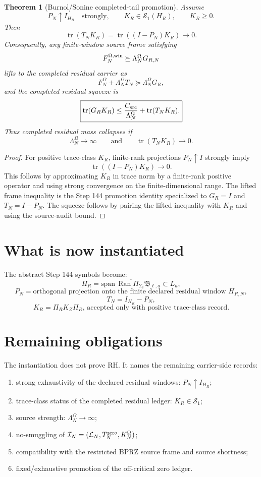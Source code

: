 \documentclass[11pt]{article}
\newtheorem{theorem}{Theorem}
\begin{document}
\begin{theorem}[Burnol/Sonine completed-tail promotion]
Assume
\[
P_N\uparrow I_{H_R}\quad\text{strongly},
\qquad
K_R\in\mathcal S_1(H_R),
\qquad K_R\ge0.
\]
Then
\[
\boxed{
\operatorname{tr}(T_NK_R)=\operatorname{tr}((I-P_N)K_R)\to0.
}
\]
Consequently, any finite-window source frame satisfying
\[
F_N^{\Omega,\rm win}\succeq \Lambda_N^\Omega G_{R,N}
\]
lifts to the completed residual carrier as
\[
F_N^\Omega+\Lambda_N^\Omega T_N\succeq \Lambda_N^\Omega G_R,
\]
and the completed residual squeeze is
\[
\boxed{
\operatorname{tr}(G_RK_R)
\le
\frac{C_{\rm src}}{\Lambda_N^\Omega}
+\operatorname{tr}(T_NK_R).
}
\]
Thus completed residual mass collapses if
\[
\Lambda_N^\Omega\to\infty
\qquad\text{and}\qquad
\operatorname{tr}(T_NK_R)\to0.
\]
\end{theorem}

\begin{proof}
For positive trace-class $K_R$, finite-rank projections $P_N\uparrow I$ strongly imply
\[
\operatorname{tr}((I-P_N)K_R)\to0.
\]
This follows by approximating $K_R$ in trace norm by a finite-rank positive operator and using strong convergence on the finite-dimensional range.  The lifted frame inequality is the Step 144 promotion identity specialized to $G_R=I$ and $T_N=I-P_N$.  The squeeze follows by pairing the lifted inequality with $K_R$ and using the source-audit bound.
\end{proof}

\section{What is now instantiated}
The abstract Step 144 symbols become:
\[
\boxed{H_R=\overline{\mathrm{span}\,\operatorname{Ran}\Pi_{Y_a}\mathfrak B_{\ell,a}}\subset L_a,}
\]
\[
\boxed{P_N=\text{orthogonal projection onto the finite declared residual window }H_{R,N},}
\]
\[
\boxed{T_N=I_{H_R}-P_N,}
\]
\[
\boxed{K_R=\Pi_RK_Z\Pi_R\text{, accepted only with positive trace-class record.}}
\]

\section{Remaining obligations}
The instantiation does not prove RH.  It names the remaining carrier-side records:
\begin{enumerate}[leftmargin=2em]
\item strong exhaustivity of the declared residual windows: $P_N\uparrow I_{H_R}$;
\item trace-class status of the completed residual ledger: $K_R\in\mathcal S_1$;
\item source strength: $\Lambda_N^\Omega\to\infty$;
\item no-smuggling of $\mathcal I_N=(\mathcal L_N,T_N^{\rm zero},K_N^\Omega)$;
\item compatibility with the restricted BPRZ source frame and source shortness;
\item fixed/exhaustive promotion of the off-critical zero ledger.
\end{enumerate}
\end{document}
